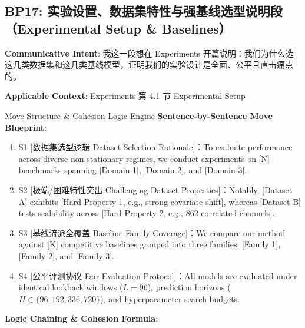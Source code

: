 \subsection{BP17: 实验设置、数据集特性与强基线选型说明段（Experimental Setup \& Baselines）}\label{sec:bp:BP17}
\noindent\textbf{\color{AcadNavy}Communicative Intent}: 我这一段想在 Experiments 开篇说明：我们为什么选这几类数据集和这几类基线模型，证明我们的实验设计是全面、公平且直击痛点的。\par\vspace{2pt}
\noindent\textbf{\color{AcadSlate}Applicable Context}: Experiments 第 4.1 节 Experimental Setup\par\vspace{4pt}
\begin{ConceptBox}{Move Structure \& Cohesion Logic Engine}
\textbf{Sentence-by-Sentence Move Blueprint}:
\begin{enumerate}[label=\textbf{\color{AcadNavy}S\arabic*.}, leftmargin=2em, itemsep=2pt]
  \item S1 [数据集选型逻辑 Dataset Selection Rationale]：To evaluate performance across diverse non-stationary regimes, we conduct experiments on [N] benchmarks spanning [Domain 1], [Domain 2], and [Domain 3].
  \item S2 [极端/困难特性突出 Challenging Dataset Properties]：Notably, [Dataset A] exhibits [Hard Property 1, e.g., strong covariate shift], whereas [Dataset B] tests scalability across [Hard Property 2, e.g., 862 correlated channels].
  \item S3 [基线流派全覆盖 Baseline Family Coverage]：We compare our method against [K] competitive baselines grouped into three families: [Family 1], [Family 2], and [Family 3].
  \item S4 [公平评测协议 Fair Evaluation Protocol]：All models are evaluated under identical lookback windows ($L=96$), prediction horizons ($H \in \{96, 192, 336, 720\}$), and hyperparameter search budgets.
\end{enumerate}\par\vspace{4pt}
\textbf{Logic Chaining \& Cohesion Formula}:\par{}
\end{ConceptBox}
